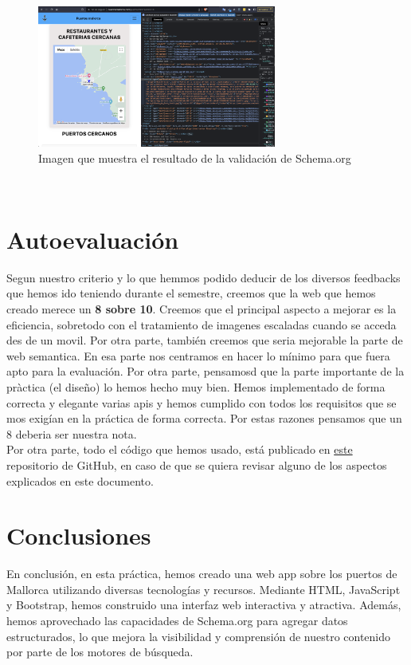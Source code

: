 \documentclass{article}
\begin{document}
\begin{figure}[ht]
    \centering
    \includegraphics[width=0.7\textwidth]{images/webSBe.png}
    \caption{Imagen que muestra el resultado de la validación de Schema.org}
\end{figure}\\

\section{Autoevaluación}
Segun nuestro criterio y lo que hemmos podido deducir de los diversos feedbacks que hemos ido teniendo durante el semestre, creemos que la web que hemos creado merece un \textbf{8 sobre 10}. Creemos que el principal aspecto a mejorar es la eficiencia, sobretodo con el tratamiento de imagenes escaladas cuando se acceda des de un movil. Por otra parte, también creemos que seria mejorable la parte de web semantica. En esa parte nos centramos en hacer lo mínimo para que fuera apto para la evaluación. Por otra parte, pensamosd que la parte importante de la pràctica (el diseño) lo hemos hecho muy bien. Hemos implementado de forma correcta y elegante varias apis y hemos cumplido con todos los requisitos que se mos exigían en la práctica de forma correcta. Por estas razones pensamos que un 8 deberia ser nuestra nota.\\

\noindent Por otra parte, todo el código que hemos usado, está publicado en \href{https://github.com/Joan13the13the13/PuertosMallorca}{este} repositorio de GitHub, en caso de que se quiera revisar alguno de los aspectos explicados en este documento.

\section{Conclusiones}
En conclusión, en esta práctica, hemos creado una web app sobre los puertos de Mallorca utilizando diversas tecnologías y recursos. Mediante HTML, JavaScript y Bootstrap, hemos construido una interfaz web interactiva y atractiva. Además, hemos aprovechado las capacidades de Schema.org para agregar datos estructurados, lo que mejora la visibilidad y comprensión de nuestro contenido por parte de los motores de búsqueda.\\
\end{document}
